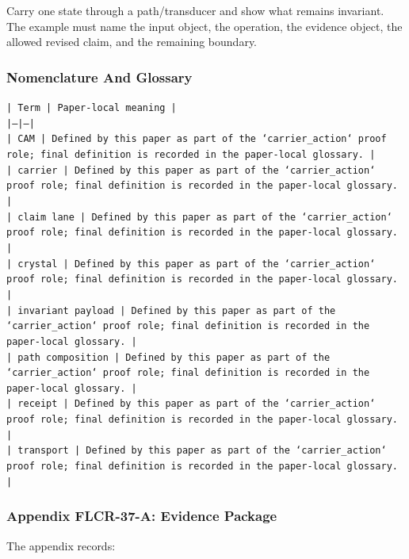 \documentclass[11pt]{article}
\begin{document}
Carry one state through a path/transducer and show what remains invariant. The example must name the input object, the operation,
the evidence object, the allowed revised claim, and the remaining boundary.

\subsubsection*{Nomenclature And Glossary}

\noindent\texttt{| Term | Paper-local meaning |}\\
\noindent\texttt{|---|---|}\\
\noindent\texttt{| CAM | Defined by this paper as part of the `carrier\_action` proof role; final definition is recorded in the paper-local glossary. |}\\
\noindent\texttt{| carrier | Defined by this paper as part of the `carrier\_action` proof role; final definition is recorded in the paper-local glossary. |}\\
\noindent\texttt{| claim lane | Defined by this paper as part of the `carrier\_action` proof role; final definition is recorded in the paper-local glossary. |}\\
\noindent\texttt{| crystal | Defined by this paper as part of the `carrier\_action` proof role; final definition is recorded in the paper-local glossary. |}\\
\noindent\texttt{| invariant payload | Defined by this paper as part of the `carrier\_action` proof role; final definition is recorded in the paper-local glossary. |}\\
\noindent\texttt{| path composition | Defined by this paper as part of the `carrier\_action` proof role; final definition is recorded in the paper-local glossary. |}\\
\noindent\texttt{| receipt | Defined by this paper as part of the `carrier\_action` proof role; final definition is recorded in the paper-local glossary. |}\\
\noindent\texttt{| transport | Defined by this paper as part of the `carrier\_action` proof role; final definition is recorded in the paper-local glossary. |}\\

\subsubsection*{Appendix FLCR-37-A: Evidence Package}

The appendix records:
\end{document}

